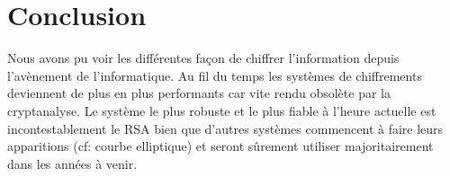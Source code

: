 \chapter*{Conclusion}
Nous avons pu voir les différentes façon de chiffrer l'information depuis l'avènement de l'informatique. Au fil du temps les systèmes de chiffrements deviennent de plus en plus performants car vite rendu obsolète par la cryptanalyse. Le système le plus robuste et le plus fiable à l'heure actuelle est incontestablement le RSA bien que d'autres systèmes commencent à faire leurs apparitions (cf: courbe elliptique) et seront sûrement utiliser majoritairement dans les années à venir. 
